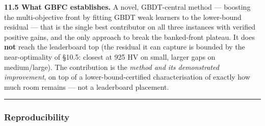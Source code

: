 \documentclass[
  11pt,
]{article}
\begin{document}
\textbf{11.5 What GBFC establishes.} A novel, GBDT-central method ---
boosting the multi-objective front by fitting GBDT weak learners to the
lower-bound residual --- that is the single best contributor on all
three instances with verified positive gains, and the only approach to
break the banked-front plateau. It does \textbf{not} reach the
leaderboard top (the residual it can capture is bounded by the
near-optimality of §10.5: closest at 925 HV on small, larger gaps on
medium/large). The contribution is the \emph{method and its demonstrated
improvement}, on top of a lower-bound-certified characterisation of
exactly how much room remains --- not a leaderboard placement.

\begin{center}\rule{0.5\linewidth}{0.5pt}\end{center}

\hypertarget{reproducibility}{%
\subsubsection{Reproducibility}\label{reproducibility}}
\end{document}
